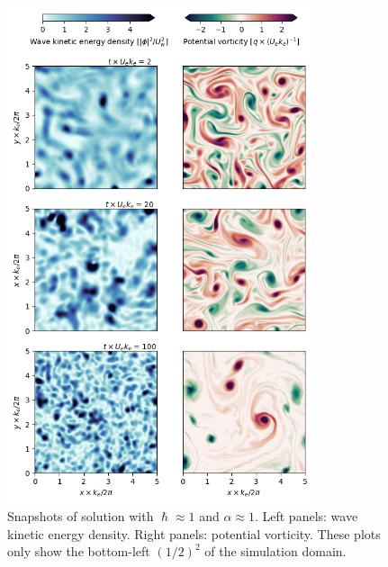 \documentclass[final]{beamer}
\begin{document}
\begin{frame}[t]
\begin{columns}[t]
\begin{column}{0.55\textwidth}
\begin{columns}
\begin{column}{.475\textwidth}
                        \begin{figure}
                          \includegraphics[width=0.8\textwidth]{figs/snapshots_turbulence.png}
                          \caption{Snapshots of solution with $\hslash \approx 1$
                                  and $\alpha \approx 1$. Left panels: wave kinetic energy density.
                                  Right panels: potential vorticity. These plots only show the bottom-left
                                 $(1/2)^2$ of the simulation domain.}
                        \end{figure}


\end{column}
\end{columns}
\end{column}
\end{columns}
\end{frame}
\end{document}
